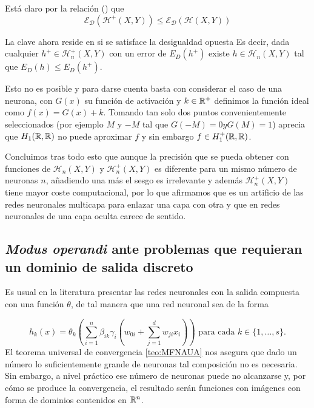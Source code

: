 \begin{aportacionOriginal}
Está claro por la relación  
 ()
 que 
 \begin{equation}
    \mathcal{E}_{\mathcal{D}}(\mathcal{H}^+(X,Y))
    \leq
    \mathcal{E}_{\mathcal{D}}(\mathcal{H}(X,Y))
 \end{equation}

 La clave ahora reside en si se satisface la desigualdad opuesta
Es decir, dada cualquier $h^+ \in \mathcal{H}^+_n(X,Y)$ con un error de $E_D(h^+)$ existe $h \in \mathcal{H}_n(X,Y)$  tal que $E_D(h) \leq E_D(h^+).$  

Esto no es posible y para darse cuenta basta con considerar el caso de una neurona, con $G(x)$ su función de activación y $k \in \mathbb{R}^+$ definimos la función ideal como $f(x) = G(x) +k$. 
Tomando tan solo dos puntos convenientemente seleccionados (por ejemplo $M$ y $-M$ tal que $G(-M) = 0 y G(M) = 1$) aprecia que $H_1(\mathbb{R}, \mathbb{R})$ no puede aproximar $f$ y sin embargo $f \in H^+_1(\mathbb{R}, \mathbb{R})$.


Concluimos tras todo esto que aunque la precisión
 que se pueda obtener con funciones de
 $\mathcal{H}_n(X,Y)$ y $\mathcal{H}^+_n(X,Y)$ es
  diferente para un mismo número de neuronas $n$,
  añadiendo una más el sesgo es irrelevante  y 
  además $\mathcal{H}^+_n(X,Y)$ tiene mayor coste
   computacional, por lo que afirmamos que 
es un artificio de las redes neuronales multicapa para enlazar una capa con otra y que en redes neuronales de una capa oculta carece de sentido.

\end{aportacionOriginal} %


\subsection{\textit{Modus operandi} ante problemas que requieran un dominio de salida discreto}
\label{ch05:dominio-discreto}

Es usual en la literatura presentar las redes neuronales con la salida compuesta con una función $\theta$, de tal manera que una red neuronal sea de la forma

\begin{equation}\label{red-neuronal-con-compuesta}
    h_k(x) = \theta_k 
    \left(
        \sum_{i=1}^{n} \beta_{i k} \gamma_{i}
    \left(
        w_{0 i} + \sum_{j=1}^d w_{j i } x_i
    \right) 
    \right)
    \text{ para cada  } k \in \{1, \ldots, s \}.
\end{equation}
El teorema universal de convergencia \ref{teo:MFNAUA} nos asegura 
que dado un número lo suficientemente grande de neuronas tal 
composición no es necesaria. Sin embargo, a nivel práctico ese 
número de neuronas puede no alcanzarse y, por cómo se produce la convergencia, el resultado serán funciones con imágenes con forma de dominios contenidos en $\mathbb{R}^n$.

